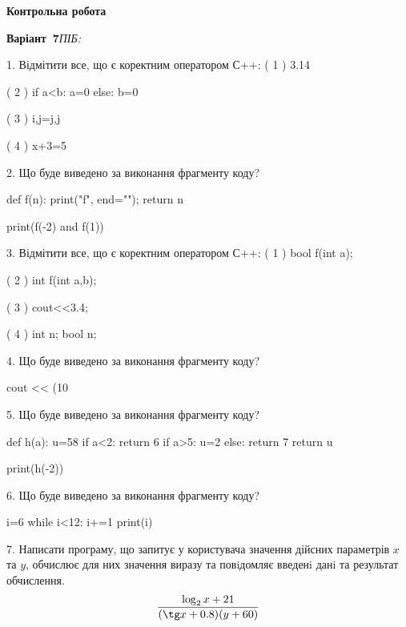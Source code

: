 \documentclass[11pt]{article}
\begin{document}
{\large\textbf{Контрольна робота}}

\textbf{Варіант \No\,7}\hfill \textit{ПІБ:}\,\underline{\hspace{60mm}}
\vspace{4mm}

1. %
Відмітити все, що є коректним оператором С++:
( 1 ) 3.14%

( 2 ) if a<b: a=0 else: b=0

( 3 ) i,j=j,j

( 4 ) x+3=5
\vspace{5mm}

2. Що буде виведено за виконання фрагменту коду?

def f(n):
    print("f", end="");
    return n

print(f(-2) and f(1))
\vspace{5mm}

3. %
Відмітити все, що є коректним оператором С++:
( 1 ) bool f(int a);

( 2 ) int f(int a,b);

( 3 ) cout<<3.4;

( 4 ) int n; bool n;
\vspace{5mm}

4. Що буде виведено за виконання фрагменту коду?

cout << (10 %
\vspace{5mm}

5. Що буде виведено за виконання фрагменту коду?

def h(a):
    u=58
    if a<2: 
        return 6
    if a>5:
         u=2
    else:
         return 7
    return u

print(h(-2))
\vspace{5mm}

6. Що буде виведено за виконання фрагменту коду?

i=6
while i<12:
    i+=1
print(i)

\vspace{5mm}

7. 
Написати програму, що запитує у користувача значення дійсних параметрів $x$ та $y$, обчислює для них значення виразу та повiдомляє введенi данi та результат обчислення.
$$\frac{\log_{2} x + 21}{(\tg x + 0.8) (y + 60)}$$ 
\end{document}
